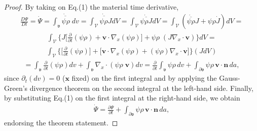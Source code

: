 \begin{proof}
By taking on Eq.(1) the material time derivative,
\begin{align*}
\frac{D\Psi}{Dt}=\dot{\Psi}=\dot{\overline{\int_{\mathfrak{v}}\psi\rho\;dv}}=
\dot{\overline{\int_{\mathscr{V}}\psi\rho{J}dV}}=
\int_{\mathscr{V}}\dot{\overline{\psi\rho{J}}}dV=
\int_{\mathscr{V}}(\dot{\overline{\psi\rho}}J+\psi\rho\dot{J})dV=
\end{align*}
\begin{align*}
\int_{\mathscr{V}}\Big\{J\Big[\frac{\partial}{\partial{t}}(\psi\rho)+
  \mathbf{v}\!\cdot\!\nabla_x(\psi\rho)\Big]+
\psi\rho\;(J\nabla_x\!\cdot\!\mathbf{v})\Big\}dV=
\end{align*}
\begin{align*}
\int_{\mathscr{V}}\Big\{\Big[\frac{\partial}{\partial{t}}(\psi\rho)\Big]
+\big[\mathbf{v}\!\cdot\!\nabla_x(\psi\rho)+
  (\psi\rho)\nabla_x\!\cdot\!\mathbf{v}\big]\Big\}(JdV)
\end{align*}
\begin{align*}
=\int_{\mathfrak{v}}\frac{\partial}{\partial{t}}(\psi\rho)dv+
\int_{\mathfrak{v}}\nabla_x\!\cdot\!(\psi\rho\;\mathbf{v})dv=
\frac{\partial}{\partial{t}}\int_{\mathfrak{v}}\psi\rho\,dv+
\int_{\partial\mathfrak{v}}\psi\rho\,\mathbf{v}\!\cdot\!\mathbf{n}\,da,
\end{align*}
since $\partial_t(dv)=0$ ($\mathbf{x}$ fixed) on the first integral
and by applying the Gauss-Green's divergence theorem on the second
integral at the left-hand side. Finally, by substituting Eq.(1) on the
first integral at the right-hand side, we obtain
\begin{align}
\dot{\Psi}=\frac{\partial\Psi}{\partial{t}}+
\int_{\partial\mathfrak{v}}\psi\rho\,\mathbf{v}\!\cdot\!\mathbf{n}\,da,
\end{align}
endorsing the theorem statement.
\end{proof}


